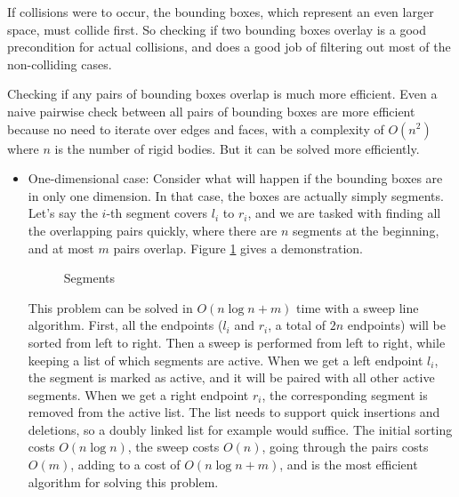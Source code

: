 \documentclass[12pt,a4paper,twoside,openright]{report}
\begin{document}
If collisions were to occur, the bounding boxes, which represent an even larger space, must collide first. So checking if two bounding boxes overlay is a good precondition for actual collisions, and does a good job of filtering out most of the non-colliding cases.

Checking if any pairs of bounding boxes overlap is much more efficient. Even a naive pairwise check between all pairs of bounding boxes are more efficient because no need to iterate over edges and faces, with a complexity of $O(n^2)$ where $n$ is the number of rigid bodies. But it can be solved more efficiently.

\begin{itemize}
\item One-dimensional case: Consider what will happen if the bounding boxes are in only one dimension. In that case, the boxes are actually simply segments. Let's say the $i$-th segment covers $l_i$ to $r_i$, and we are tasked with finding all the overlapping pairs quickly, where there are $n$ segments at the beginning, and at most $m$ pairs overlap. Figure \ref{seglbl} gives a demonstration.

\begin{figure}\label{seglbl}
    \begin{center}
      \end{center}
    \caption{Segments}
\end{figure}

This problem can be solved in $O(n \log n + m)$ time with a sweep line algorithm. First, all the endpoints ($l_i$ and $r_i$, a total of $2n$ endpoints) will be sorted from left to right. Then a sweep is performed from left to right, while keeping a list of which segments are active. When we get a left endpoint $l_i$, the segment is marked as active, and it will be paired with all other active segments. When we get a right endpoint $r_i$, the corresponding segment is removed from the active list. The list needs to support quick insertions and deletions, so a doubly linked list for example would suffice. The initial sorting costs $O(n\log n)$, the sweep costs $O(n)$, going through the pairs costs $O(m)$, adding to a cost of $O(n\log n + m)$, and is the most efficient algorithm for solving this problem.


\end{itemize}
\end{document}
